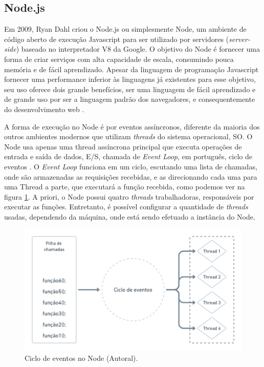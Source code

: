 \subsection{Node.js}
\label{fund:node}
Em 2009, Ryan Dahl criou o Node.js ou simplesmente Node, um ambiente de código aberto de execução Javascript para ser utilizado por servidores (\textit{server-side}) baseado no interpretador V8 da Google. O objetivo do Node é fornecer uma forma de criar serviços com alta capacidade de escala, consumindo pouca memória e de fácil aprendizado. Apesar da linguagem de programação Javascript fornecer uma performance inferior às linguagens já existentes para esse objetivo, seu uso oferece dois grande benefícios, ser uma linguagem de fácil aprendizado e de grande uso por ser a linguagem padrão dos navegadores, e consequentemente do desenvolvimento web \cite{tilkov2010node}.

A forma de execução no Node é por eventos assíncronos, diferente da maioria dos outros ambientes modernos que utilizam \textit{threads} do sistema operacional, SO. O Node usa apenas uma thread assíncrona principal que executa operações de entrada e saída de dados, E/S, chamada de \textit{Event Loop}, em português, ciclo de eventos \cite{nodejsAbout}. O \textit{Event Loop} funciona em um ciclo, escutando uma lista de chamadas, onde são armazenadas as requisições recebidas, e as direcionando cada uma para uma Thread a parte, que executará a função recebida, como podemos ver na figura \ref{fig:event-loop-node}. A priori, o  Node possui quatro \textit{threads} trabalhadoras, responsáveis por executar as funções. Entretanto, é possível configurar a quantidade de \textit{threads} usadas, dependendo da máquina, onde está sendo efetuado a instância do Node.

\begin{figure}[H]
  \centering
  \includegraphics[width=.80\textwidth]{assets/event-loop-node.png} 
  \caption{Ciclo de eventos no Node (Autoral).}
  \label{fig:event-loop-node} 
\end{figure}

